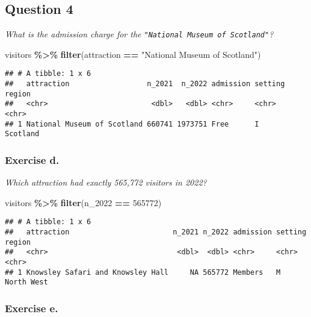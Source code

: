 \documentclass[
]{article}
\newenvironment{Shaded}{\begin{snugshade}}{\end{snugshade}}
\newcommand{\DecValTok}[1]{\textcolor[rgb]{0.00,0.00,0.81}{#1}}
\newcommand{\FunctionTok}[1]{\textcolor[rgb]{0.13,0.29,0.53}{\textbf{#1}}}
\newcommand{\NormalTok}[1]{#1}
\newcommand{\SpecialCharTok}[1]{\textcolor[rgb]{0.81,0.36,0.00}{\textbf{#1}}}
\newcommand{\StringTok}[1]{\textcolor[rgb]{0.31,0.60,0.02}{#1}}
\begin{document}
\subsection{Question 4}\label{question-4}

\emph{What is the admission charge for the
\texttt{"National\ Museum\ of\ Scotland"}?}

\begin{Shaded}
\begin{Highlighting}[]
\NormalTok{visitors }\SpecialCharTok{\%\textgreater{}\%} \FunctionTok{filter}\NormalTok{(attraction }\SpecialCharTok{==} \StringTok{"National Museum of Scotland"}\NormalTok{)}
\end{Highlighting}
\end{Shaded}

\begin{verbatim}
## # A tibble: 1 x 6
##   attraction                  n_2021  n_2022 admission setting region  
##   <chr>                        <dbl>   <dbl> <chr>     <chr>   <chr>   
## 1 National Museum of Scotland 660741 1973751 Free      I       Scotland
\end{verbatim}

\subsubsection{Exercise d.}\label{exercise-d.}

\emph{Which attraction had exactly 565,772 visitors in 2022?}

\begin{Shaded}
\begin{Highlighting}[]
\NormalTok{visitors }\SpecialCharTok{\%\textgreater{}\%} \FunctionTok{filter}\NormalTok{(n\_2022 }\SpecialCharTok{==} \DecValTok{565772}\NormalTok{)}
\end{Highlighting}
\end{Shaded}

\begin{verbatim}
## # A tibble: 1 x 6
##   attraction                        n_2021 n_2022 admission setting region    
##   <chr>                              <dbl>  <dbl> <chr>     <chr>   <chr>     
## 1 Knowsley Safari and Knowsley Hall     NA 565772 Members   M       North West
\end{verbatim}

\subsubsection{Exercise e.}\label{exercise-e.}
\end{document}
